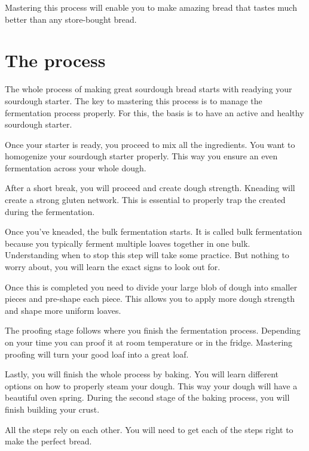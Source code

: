 Mastering this process will enable you to make amazing bread
that tastes much better than any store-bought bread.

\section{The process}

\begin{flowchart}[!htb]
  \centering
  
  \caption{The typical process of making a wheat-based sourdough bread.}%
  \label{fig:wheat-sourdough-process}
\end{flowchart}

The whole process of making great sourdough bread starts with
readying your sourdough starter. The key to mastering
this process is to manage the fermentation process properly.
For this, the basis is to have an active and healthy
sourdough starter.

Once your starter is ready, you proceed to mix all the ingredients.
You want to homogenize your sourdough starter properly. This
way you ensure an even fermentation across your whole dough.

After a short break, you will proceed and create dough strength.
Kneading will create a strong gluten network. This is essential
to properly trap the  created during the fermentation.

Once you've kneaded, the bulk fermentation starts. It is called bulk fermentation
because you typically ferment multiple loaves together in one bulk.
Understanding when to stop this step will take some practice.
But nothing to worry about, you will learn the exact signs to look out for.

Once this is completed you need to divide your large blob of
dough into smaller pieces and pre-shape each piece. This allows
you to apply more dough strength and shape more uniform loaves.

The proofing stage follows where you finish the fermentation process.
Depending on your time you can proof it at room temperature or in the fridge.
Mastering proofing will turn your good loaf into a great loaf.

Lastly, you will finish the whole process by baking. You will learn different
options on how to properly steam your dough. This way your
dough will have a beautiful oven spring. During the second
stage of the baking process, you will finish building your crust.

All the steps rely on each other. You will need to get each of
the steps right to make the perfect bread.


